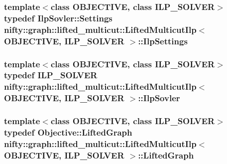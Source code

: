 \subsubsection[{Ilp\+Settings}]{\setlength{\rightskip}{0pt plus 5cm}template$<$class O\+B\+J\+E\+C\+T\+I\+V\+E, class I\+L\+P\+\_\+\+S\+O\+L\+V\+E\+R$>$ typedef Ilp\+Sovler\+::\+Settings {\bf nifty\+::graph\+::lifted\+\_\+multicut\+::\+Lifted\+Multicut\+Ilp}$<$ O\+B\+J\+E\+C\+T\+I\+V\+E, I\+L\+P\+\_\+\+S\+O\+L\+V\+E\+R $>$\+::{\bf Ilp\+Settings}}\label{classnifty_1_1graph_1_1lifted__multicut_1_1LiftedMulticutIlp_a1660192dd643891762ce8f0e576a7053}
\hypertarget{classnifty_1_1graph_1_1lifted__multicut_1_1LiftedMulticutIlp_abb75426c93adf0ef05ce4a38004dbaef}{}
\subsubsection[{Ilp\+Sovler}]{\setlength{\rightskip}{0pt plus 5cm}template$<$class O\+B\+J\+E\+C\+T\+I\+V\+E, class I\+L\+P\+\_\+\+S\+O\+L\+V\+E\+R$>$ typedef I\+L\+P\+\_\+\+S\+O\+L\+V\+E\+R {\bf nifty\+::graph\+::lifted\+\_\+multicut\+::\+Lifted\+Multicut\+Ilp}$<$ O\+B\+J\+E\+C\+T\+I\+V\+E, I\+L\+P\+\_\+\+S\+O\+L\+V\+E\+R $>$\+::{\bf Ilp\+Sovler}}\label{classnifty_1_1graph_1_1lifted__multicut_1_1LiftedMulticutIlp_abb75426c93adf0ef05ce4a38004dbaef}
\hypertarget{classnifty_1_1graph_1_1lifted__multicut_1_1LiftedMulticutIlp_a754b340c90447fa603a1d05c0ce0aa72}{}
\subsubsection[{Lifted\+Graph}]{\setlength{\rightskip}{0pt plus 5cm}template$<$class O\+B\+J\+E\+C\+T\+I\+V\+E, class I\+L\+P\+\_\+\+S\+O\+L\+V\+E\+R$>$ typedef Objective\+::\+Lifted\+Graph {\bf nifty\+::graph\+::lifted\+\_\+multicut\+::\+Lifted\+Multicut\+Ilp}$<$ O\+B\+J\+E\+C\+T\+I\+V\+E, I\+L\+P\+\_\+\+S\+O\+L\+V\+E\+R $>$\+::{\bf Lifted\+Graph}}\label{classnifty_1_1graph_1_1lifted__multicut_1_1LiftedMulticutIlp_a754b340c90447fa603a1d05c0ce0aa72}
\hypertarget{classnifty_1_1graph_1_1lifted__multicut_1_1LiftedMulticutIlp_adc3cc80eb39cbab34f157892edbb8b51}{}

